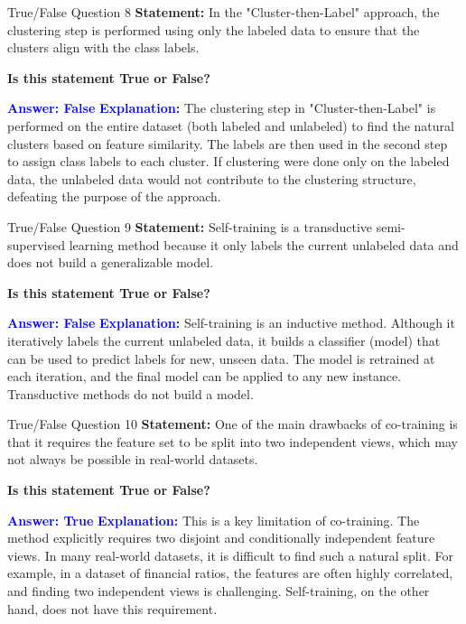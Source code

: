 \documentclass{beamer}
\begin{document}
	\begin{frame}{True/False Question 8}
		\textbf{Statement:} In the "Cluster-then-Label" approach, the clustering step is performed using only the labeled data to ensure that the clusters align with the class labels.
		
		\vspace{0.3cm}
		\textbf{Is this statement True or False?}
		
		\vspace{0.2cm}
		\textcolor{blue}{\textbf{Answer: False}}
		\vspace{0.2cm}
		\textcolor{blue}{\textbf{Explanation:}} The clustering step in "Cluster-then-Label" is performed on the entire dataset (both labeled and unlabeled) to find the natural clusters based on feature similarity. The labels are then used in the second step to assign class labels to each cluster. If clustering were done only on the labeled data, the unlabeled data would not contribute to the clustering structure, defeating the purpose of the approach.
	\end{frame}
	
	\begin{frame}{True/False Question 9}
		\textbf{Statement:} Self-training is a transductive semi-supervised learning method because it only labels the current unlabeled data and does not build a generalizable model.
		
		\vspace{0.3cm}
		\textbf{Is this statement True or False?}
		
		\vspace{0.2cm}
		\textcolor{blue}{\textbf{Answer: False}}
		\vspace{0.2cm}
		\textcolor{blue}{\textbf{Explanation:}} Self-training is an inductive method. Although it iteratively labels the current unlabeled data, it builds a classifier (model) that can be used to predict labels for new, unseen data. The model is retrained at each iteration, and the final model can be applied to any new instance. Transductive methods do not build a model.
	\end{frame}
	
	\begin{frame}{True/False Question 10}
		\textbf{Statement:} One of the main drawbacks of co-training is that it requires the feature set to be split into two independent views, which may not always be possible in real-world datasets.
		
		\vspace{0.3cm}
		\textbf{Is this statement True or False?}
		
		\vspace{0.2cm}
		\textcolor{blue}{\textbf{Answer: True}}
		\vspace{0.2cm}
		\textcolor{blue}{\textbf{Explanation:}} This is a key limitation of co-training. The method explicitly requires two disjoint and conditionally independent feature views. In many real-world datasets, it is difficult to find such a natural split. For example, in a dataset of financial ratios, the features are often highly correlated, and finding two independent views is challenging. Self-training, on the other hand, does not have this requirement.
	\end{frame}
	
\end{document}
